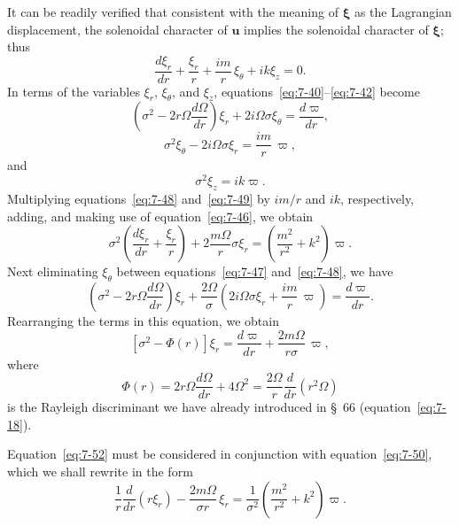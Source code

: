It can be readily verified that consistent with the meaning of $\boldsymbol{\xi}$ as the
Lagrangian displacement, the solenoidal character of $\mathbf{u}$ implies the
solenoidal character of $\boldsymbol{\xi}$; thus
\begin{equation}
\label{eq:7-46}
\frac{d\xi_r}{dr} + \frac{\xi_r}{r} + \frac{im}{r}\,\xi_\theta + ik\xi_z = 0.
\end{equation}
In terms of the variables $\xi_r$, $\xi_\theta$, and $\xi_z$, equations~\eqref{eq:7-40}--\eqref{eq:7-42} become
\begin{equation}
\label{eq:7-47}
\left(\sigma^2 - 2r\Omega\frac{d\Omega}{dr}\right)\xi_r + 2i\Omega\sigma\xi_\theta
= \frac{d\varpi}{dr},
\end{equation}
\begin{equation}
\label{eq:7-48}
\sigma^2 \xi_\theta - 2i\Omega\sigma\xi_r = \frac{im}{r}\,\varpi,
\end{equation}
and
\begin{equation}
\label{eq:7-49}
\sigma^2 \xi_z = ik\varpi.
\end{equation}
Multiplying equations~\eqref{eq:7-48} and~\eqref{eq:7-49} by $im/r$ and $ik$, respectively,
adding, and making use of equation~\eqref{eq:7-46}, we obtain
\begin{equation}
\label{eq:7-50}
\sigma^2\!\left(\frac{d\xi_r}{dr}+\frac{\xi_r}{r}\right)
+ 2\frac{m\Omega}{r}\sigma\xi_r
= \left(\frac{m^2}{r^2}+k^2\right)\varpi.
\end{equation}
Next eliminating $\xi_\theta$ between equations~\eqref{eq:7-47} and~\eqref{eq:7-48}, we have
\begin{equation}
\label{eq:7-51}
\left(\sigma^2 - 2r\Omega\frac{d\Omega}{dr}\right)\xi_r
+ \frac{2\Omega}{\sigma}\!\left(2i\Omega\sigma\xi_r
+ \frac{im}{r}\,\varpi\right)
= \frac{d\varpi}{dr}.
\end{equation}
Rearranging the terms in this equation, we obtain
\begin{equation}
\label{eq:7-52}
[\sigma^2 - \Phi(r)]\xi_r = \frac{d\varpi}{dr}
+ \frac{2m\Omega}{r\sigma}\,\varpi,
\end{equation}
where
\begin{equation}
\label{eq:7-53}
\Phi(r) = 2r\Omega\frac{d\Omega}{dr} + 4\Omega^2
= \frac{2\Omega}{r}\frac{d}{dr}(r^2\Omega)
\end{equation}
is the Rayleigh discriminant we have already introduced in \S~66 (equation~\eqref{eq:7-18}).

Equation~\eqref{eq:7-52} must be considered in conjunction with equation~\eqref{eq:7-50}, which we shall rewrite in the form
\begin{equation}
\label{eq:7-54}
\frac{1}{r}\frac{d}{dr}(r\xi_r)
- \frac{2m\Omega}{\sigma r}\,\xi_r
= \frac{1}{\sigma^2}\!\left(\frac{m^2}{r^2}+k^2\right)\varpi.
\end{equation}

